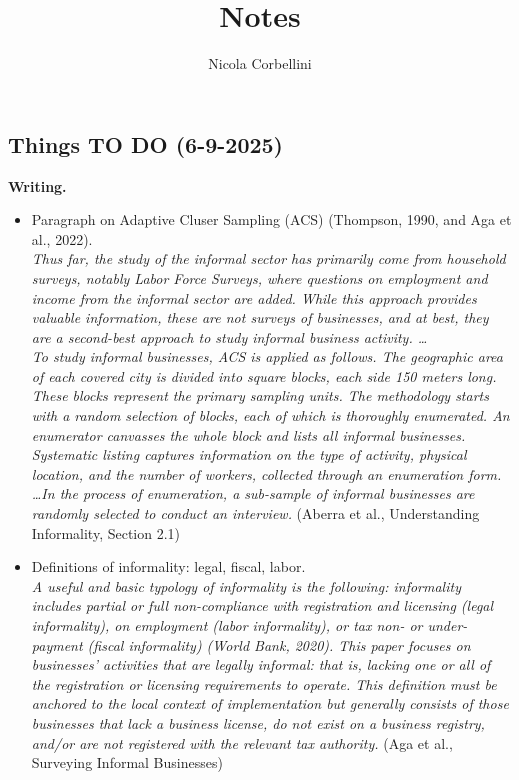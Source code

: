 \documentclass[letterpaper, 12pt]{article}
\author{Nicola Corbellini}
\date{}
\title{Notes}
\begin{document}
\maketitle
\noindent

\subsection{Things TO DO (6-9-2025)}

\textbf{Writing.}
\begin{itemize}
    \item Paragraph on Adaptive Cluser Sampling (ACS) (Thompson, 1990, and Aga et al., 2022).
    \\ \textit{Thus far, the study of the informal sector has primarily come from household surveys, notably Labor Force Surveys, where questions on employment and income from the informal sector are added. While this approach provides valuable information, these are not surveys of businesses, and at best, they are a second-best approach to study informal business activity.
    \dots
    \\To study informal businesses, ACS is applied as follows. The geographic area of each covered city is divided into square blocks, each side 150 meters long. These blocks represent the primary sampling units. The methodology starts with a random selection of blocks, each of which is thoroughly enumerated. An enumerator canvasses the whole block and lists all informal businesses. Systematic listing captures information on the type of activity, physical location, and the number of workers, collected through an enumeration form. \dots In the process of enumeration, a sub-sample of informal businesses are randomly selected to conduct an interview.} (Aberra et al., Understanding Informality, Section 2.1)
    \item Definitions of informality: legal, fiscal, labor.
    \\\textit{A useful and basic typology of informality is the following: informality includes partial or full non-compliance with registration and licensing (legal informality), on employment (labor informality), or tax non- or under-payment (fiscal informality) (World Bank, 2020). This paper focuses on businesses’ activities that are legally informal: that is, lacking one or all of the registration or licensing requirements to operate. This definition must be anchored to the local context of implementation but generally consists of those businesses that lack a business license, do not exist on a business registry, and/or are not registered with the relevant tax authority.} (Aga et al., Surveying Informal Businesses)
\end{itemize}
\end{document}
